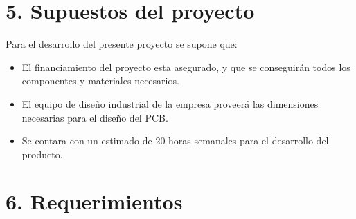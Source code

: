 \documentclass[
11pt, %
codirector, %
]{charter}
\begin{document}
\section{5. Supuestos del proyecto}
\label{sec:supuestos}

Para el desarrollo del presente proyecto se supone que:

\begin{itemize}
	\item El financiamiento del proyecto esta asegurado, y que se conseguirán todos los componentes y materiales necesarios.
	\item El equipo de diseño industrial de la empresa proveerá las dimensiones necesarias para el diseño del PCB.
	\item Se contara con un estimado de 20 horas semanales para el desarrollo del producto.
\end{itemize}

\section{6. Requerimientos}
\label{sec:requerimientos}
\end{document}
